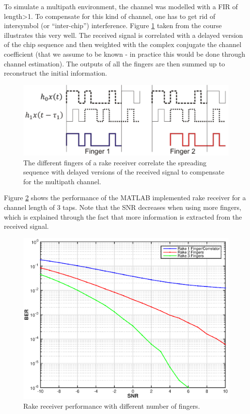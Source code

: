 \documentclass[a4paper]{article}
\begin{document}
To simulate a multipath environment, the channel was modelled with a FIR of length>1. To compensate for this kind of channel, one has to get rid of intersymbol (or ``inter-chip'') interference. Figure \ref{fig:rakefinger} taken from the course illustrates this very well. The received signal is correlated with a delayed version of the chip sequence and then weighted with the complex conjugate the channel coefficient (that we assume to be known - in practice this would be done through channel estimation). The outputs of all the fingers are then summed up to reconstruct the initial information.

\begin{figure}[htbp]
\begin{center}
\includegraphics[width=.6\textwidth]{img1/rakefinger.png}
\caption{The different fingers of a rake receiver correlate the spreading sequence with delayed versions of the received signal to compensate for the multipath channel.}
\label{fig:rakefinger}
\end{center}
\end{figure}

Figure \ref{fig:rake} shows the performance of the MATLAB implemented rake receiver for a channel length of 3 taps. Note that the SNR decreases when using more fingers, which is explained through the fact that more information is extracted from the received signal.

\begin{figure}[htbp]
\begin{center}
\includegraphics[width=.6\textwidth]{img1/rake.eps}
\caption{Rake receiver performance with different number of fingers.}
\label{fig:rake}
\end{center}
\end{figure}
\end{document}
